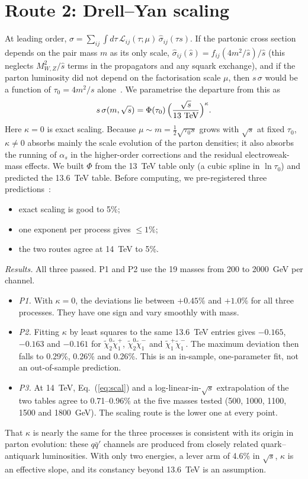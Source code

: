 \documentclass[aps,prd,twocolumn,superscriptaddress,nofootinbib,showkeys]{revtex4-2}
\begin{document}
\section{Route 2: Drell--Yan scaling}
At leading order, $\sigma=\sum_{ij}\int d\tau\,\mathcal L_{ij}(\tau;\mu)\,\hat\sigma_{ij}(\tau s)$. If the partonic cross section depends on the pair mass $m$ as its only scale, $\hat\sigma_{ij}(\hat s)=f_{ij}(4m^2/\hat s)/\hat s$ (this neglects $M_{W,Z}^2/\hat s$ terms in the propagators and any squark exchange), and if the parton luminosity did not depend on the factorisation scale $\mu$, then $s\,\sigma$ would be a function of $\tau_0=4m^2/s$ alone~\cite{DY}. We parametrise the departure from this as
\begin{equation}
s\,\sigma(m,\sqrt s)=\Phi(\tau_0)\,\Bigl(\frac{\sqrt s}{13\ \mathrm{TeV}}\Bigr)^{\kappa}.
\label{eq:scal}
\end{equation}
Here $\kappa=0$ is exact scaling. Because $\mu\sim m=\tfrac12\sqrt{\tau_0 s}$ grows with $\sqrt s$ at fixed $\tau_0$, $\kappa\neq0$ absorbs mainly the scale evolution of the parton densities; it also absorbs the running of $\alpha_s$ in the higher-order corrections and the residual electroweak-mass effects. We built $\Phi$ from the 13~TeV table only (a cubic spline in $\ln\tau_0$) and predicted the 13.6~TeV table. Before computing, we pre-registered three predictions~\cite{P4}:
\begin{itemize}
\item[(P1)] exact scaling is good to 5\%;
\item[(P2)] one exponent per process gives $\le1\%$;
\item[(P3)] the two routes agree at 14~TeV to 5\%.
\end{itemize}

\emph{Results.} All three passed. P1 and P2 use the 19 masses from 200 to 2000~GeV per channel.
\begin{itemize}
\item \emph{P1.} With $\kappa=0$, the deviations lie between $+0.45\%$ and $+1.0\%$ for all three processes. They have one sign and vary smoothly with mass.
\item \emph{P2.} Fitting $\kappa$ by least squares to the same 13.6~TeV entries gives $-0.165$, $-0.163$ and $-0.161$ for $\tilde\chi_2^0\tilde\chi_1^+$, $\tilde\chi_2^0\tilde\chi_1^-$ and $\tilde\chi_1^+\tilde\chi_1^-$. The maximum deviation then falls to 0.29\%, 0.26\% and 0.26\%. This is an in-sample, one-parameter fit, not an out-of-sample prediction.
\item \emph{P3.} At 14~TeV, Eq.~(\ref{eq:scal}) and a log-linear-in-$\sqrt s$ extrapolation of the two tables agree to 0.71--0.96\% at the five masses tested (500, 1000, 1100, 1500 and 1800~GeV). The scaling route is the lower one at every point.
\end{itemize}
That $\kappa$ is nearly the same for the three processes is consistent with its origin in parton evolution: these $q\bar q'$ channels are produced from closely related quark--antiquark luminosities. With only two energies, a lever arm of 4.6\% in $\sqrt s$, $\kappa$ is an effective slope, and its constancy beyond 13.6~TeV is an assumption.
\end{document}
